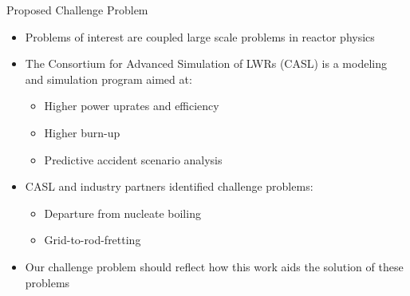 \documentclass{beamer}
\begin{document}
\begin{frame}{Proposed Challenge Problem}

  \begin{itemize}
  \item Problems of interest are coupled large scale problems in
    reactor physics
    \medskip
  \item The Consortium for Advanced Simulation of LWRs (CASL) is a
    modeling and simulation program aimed at:
    \begin{itemize}
      \item Higher power uprates and efficiency
      \item Higher burn-up
      \item Predictive accident scenario analysis
    \end{itemize}
    \medskip
  \item CASL and industry partners identified challenge problems:
    \begin{itemize}
    \item Departure from nucleate boiling
    \item Grid-to-rod-fretting
    \end{itemize}
    \medskip
  \item Our challenge problem should reflect how this work aids the
    solution of these problems
  \end{itemize}

\end{frame}
\end{document}
